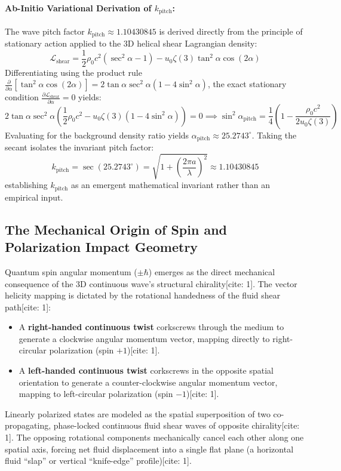 \documentclass[11pt,a4paper]{article}
\begin{document}
	\paragraph{Ab-Initio Variational Derivation of $k_{\text{pitch}}$:}
	The wave pitch factor $k_{\text{pitch}} \approx 1.10430845$ is derived directly from the principle of stationary action applied to the 3D helical shear Lagrangian density:
	\begin{equation}
		\mathcal{L}_{\text{shear}} = \frac{1}{2}\rho_0 c^2 (\sec^2\alpha - 1) - u_0 \zeta(3) \tan^2\alpha \cos(2\alpha)
	\end{equation}
	Differentiating using the product rule $\frac{\partial}{\partial \alpha}\left[\tan^2\alpha \cos(2\alpha)\right] = 2\tan\alpha \sec^2\alpha (1 - 4\sin^2\alpha)$, the exact stationary condition $\frac{\partial \mathcal{L}_{\text{shear}}}{\partial \alpha} = 0$ yields:
	\begin{equation}
		2\tan\alpha \sec^2\alpha \left( \frac{1}{2}\rho_0 c^2 - u_0 \zeta(3) (1 - 4\sin^2\alpha) \right) = 0 \implies \sin^2\alpha_{\text{pitch}} = \frac{1}{4}\left(1 - \frac{\rho_0 c^2}{2 u_0 \zeta(3)}\right)
	\end{equation}
	Evaluating for the background density ratio yields $\alpha_{\text{pitch}} \approx 25.2743^\circ$. Taking the secant isolates the invariant pitch factor:
	\begin{equation}
		k_{\text{pitch}} = \sec(25.2743^\circ) = \sqrt{1 + \left(\frac{2\pi a}{\lambda}\right)^2} \approx 1.10430845
	\end{equation}
	establishing $k_{\text{pitch}}$ as an emergent mathematical invariant rather than an empirical input.
	
	\subsection{The Mechanical Origin of Spin and Polarization Impact Geometry}
	Quantum spin angular momentum ($\pm\hbar$) emerges as the direct mechanical consequence of the 3D continuous wave's structural chirality[cite: 1]. The vector helicity mapping is dictated by the rotational handedness of the fluid shear path[cite: 1]:
	\begin{itemize}
		\item A \textbf{right-handed continuous twist} corkscrews through the medium to generate a clockwise angular momentum vector, mapping directly to right-circular polarization (spin $+1$)[cite: 1].
		\item A \textbf{left-handed continuous twist} corkscrews in the opposite spatial orientation to generate a counter-clockwise angular momentum vector, mapping to left-circular polarization (spin $-1$)[cite: 1].
	\end{itemize}
	Linearly polarized states are modeled as the spatial superposition of two co-propagating, phase-locked continuous fluid shear waves of opposite chirality[cite: 1]. The opposing rotational components mechanically cancel each other along one spatial axis, forcing net fluid displacement into a single flat plane (a horizontal fluid ``slap'' or vertical ``knife-edge'' profile)[cite: 1].
	
\end{document}
